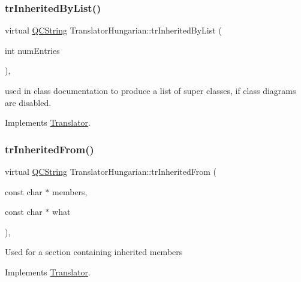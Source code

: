 \mbox{\label{class_translator_hungarian_a281f70f30a006cae3610db40716d44a6}} 
\subsubsection{\texorpdfstring{trInheritedByList()}{trInheritedByList()}}
{\footnotesize\ttfamily virtual \mbox{\hyperlink{class_q_c_string}{Q\+C\+String}} Translator\+Hungarian\+::tr\+Inherited\+By\+List (\begin{DoxyParamCaption}\item[{int}]{num\+Entries }\end{DoxyParamCaption})\hspace{0.3cm}{\ttfamily [inline]}, {\ttfamily [virtual]}}

used in class documentation to produce a list of super classes, if class diagrams are disabled. 

Implements \mbox{\hyperlink{class_translator}{Translator}}.

\mbox{\label{class_translator_hungarian_a8f2f50bc7e45fb66eef9d200f8f633f4}} 
\subsubsection{\texorpdfstring{trInheritedFrom()}{trInheritedFrom()}}
{\footnotesize\ttfamily virtual \mbox{\hyperlink{class_q_c_string}{Q\+C\+String}} Translator\+Hungarian\+::tr\+Inherited\+From (\begin{DoxyParamCaption}\item[{const char $\ast$}]{members,  }\item[{const char $\ast$}]{what }\end{DoxyParamCaption})\hspace{0.3cm}{\ttfamily [inline]}, {\ttfamily [virtual]}}

Used for a section containing inherited members 

Implements \mbox{\hyperlink{class_translator}{Translator}}.

\mbox{\label{class_translator_hungarian_ad078cc2bccbea4d1eeb0987b31f27d9a}} 

